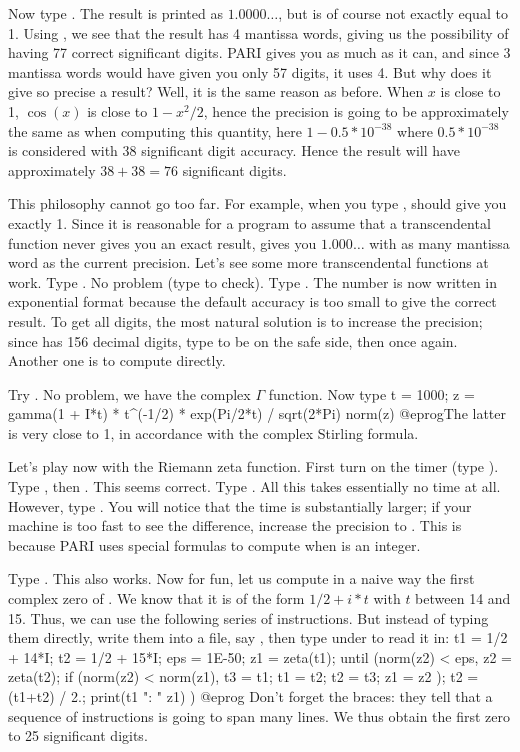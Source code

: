 Now type . The result is printed as $1.0000\dots$, but
is of course not exactly equal to 1. Using \kbd{\#\%}, we see that the
result has 4 mantissa words, giving us the possibility of having 77
correct significant digits. PARI gives you as much as it can, and since 3
mantissa words would have given you only 57 digits, it uses 4. But why does
it give so precise a result? Well, it is the same reason as before. When $x$
is close to 1, $\cos(x)$ is close to $1-x^2/2$, hence the precision is going
to be approximately the same as when computing this quantity, here
$1-0.5*10^{-38}$ where $0.5*10^{-38}$ is considered with 38 significant digit
accuracy. Hence the result will have approximately $38+38=76$ significant
digits.

This philosophy cannot go too far. For example, when you type ,
 should give you exactly 1. Since it is reasonable for a program to
assume that a transcendental function never gives you an exact result,
 gives you $1.000\dots$ with as many mantissa word as the current
precision.
\medskip
Let's see some more transcendental functions at work. Type
. No problem (type  to check). Type .
The number is now written in exponential format because the default accuracy
is too small to give the correct result. To get all digits, the most natural
solution is to increase the precision; since  has 156 decimal
digits, type  to be on the safe side, then 
once again. Another one is to compute  directly.

Try . No problem, we have the complex $\Gamma$ function.
Now type
\bprog
  t = 1000;
  z = gamma(1 + I*t) * t^(-1/2) * exp(Pi/2*t) / sqrt(2*Pi)
  norm(z)
@eprog\noindent The latter is very close to 1, in accordance with the complex
Stirling formula.
\smallskip

Let's play now with the Riemann zeta function. First turn on the timer (type
\kbd{\#}). Type , then . This seems correct. Type
. All this takes essentially no time at all. However, type
. You will notice that the time is substantially larger; if
your machine is too fast to see the difference, increase the precision to
. This is because PARI uses special formulas to compute
 when  is an integer.

Type . This also works. Now for fun, let us compute in a
naive way the first complex zero of . We know that it is
of the form $1/2 + i*t$ with $t$ between 14 and 15. Thus, we can use the
following series of instructions. But instead of typing them directly, write
them into a file, say , then type  under
 to read it in:
\bprog
  {
    t1 = 1/2 + 14*I;
    t2 = 1/2 + 15*I; eps = 1E-50;
    z1 = zeta(t1);
    until (norm(z2) < eps,
      z2 = zeta(t2);
      if (norm(z2) < norm(z1),
        t3 = t1; t1 = t2; t2 = t3; z1 = z2
      );
      t2 = (t1+t2) / 2.;
      print(t1 ": " z1)
    )
  }
@eprog\noindent
Don't forget the braces: they tell  that a sequence of instructions
is going to span many lines. We thus obtain the first zero to 25 significant
digits.

